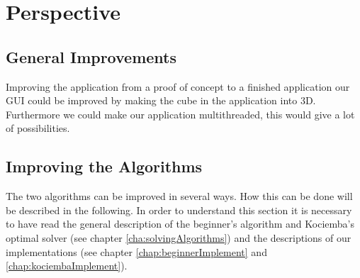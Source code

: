 \chapter{Perspective}

\section{General Improvements}
Improving the application from a proof of concept to a finished application our GUI could be improved by making the cube in the application into 3D. Furthermore we could make our application multithreaded, this would give a lot of possibilities. 


\section{Improving the Algorithms}
The two algorithms can be improved in several ways. How this can be done will be described in the following.
In order to understand this section it is necessary to have read the general description of the beginner's algorithm and Kociemba's optimal solver (see chapter \ref{cha:solvingAlgorithms}) and the descriptions of our implementations (see chapter \ref{chap:beginnerImplement} and \ref{chap:kociembaImplement}).




